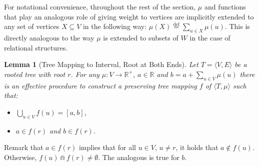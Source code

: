 \documentclass{article}
\newtheorem*{lemma}{Lemma}
\newcommand{\R}{\mathbb{R}}
\newcommand{\bcap}{\Cap}
\newcommand{\eqdef}{\stackrel{\text{def}}{=}}
\begin{document}
For notational convenience, throughout the rest of the section, $\mu$ and functions that play an analogous role of giving weight to vertices are implicitly extended to any set of vertices $X \subseteq V$ in the following way: $\mu(X) \eqdef \sum_{u \in X}\mu(u)$. This is directly analogous to the way $\mu$ is extended to subsets of $W$ in the case of relational structures.


\begin{lemma}[Tree Mapping to Interval, Root at Both Ends]
  Let $T = \langle V, E \rangle$ be a rooted tree with root $r$. For any $\mu : V \rightarrow \R^+$, $a \in \R$ and $b = a + \sum_{u \in V}\mu(u)$ there is an effective procedure to construct a preserving tree mapping $f$ of $\langle T, \mu \rangle$ such that:
  \begin{itemize}
  \item $\bigcup_{u \in V}f(u) = [a, b]$,
  \item $a \in f(r)$ and $b \in f(r)$.
  \end{itemize}
\end{lemma}
Remark that $a \in f(r)$ implies that for all $u \in V$, $u \neq r$, it holds that $a \not \in f(u)$. Otherwise, $f(u) \bcap f(r) \neq \emptyset$. The analogous is true for $b$.
\end{document}

